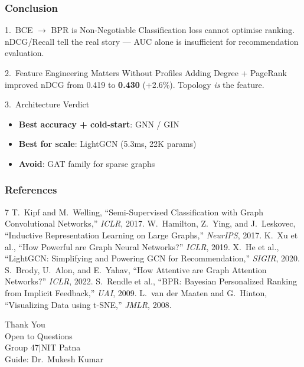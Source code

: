 \documentclass[10pt,aspectratio=43]{beamer}
\begin{document}
\begin{frame}
\frametitle{Conclusion}
\begin{alertblock}{1.\ BCE $\to$ BPR is Non-Negotiable}
Classification loss cannot optimise ranking.
nDCG/Recall tell the real story --- AUC alone is insufficient for recommendation evaluation.
\end{alertblock}
\begin{alertblock}{2.\ Feature Engineering Matters Without Profiles}
Adding Degree + PageRank improved nDCG from 0.419 to \textbf{0.430} (+2.6\%). Topology \emph{is} the feature.
\end{alertblock}
\begin{alertblock}{3.\ Architecture Verdict}
\begin{itemize}
  \item \textbf{Best accuracy + cold-start}: GNN / GIN
  \item \textbf{Best for scale}: LightGCN (5.3ms, 22K params)
  \item \textbf{Avoid}: GAT family for sparse graphs
\end{itemize}
\end{alertblock}
\end{frame}

\begin{frame}[allowframebreaks]
\frametitle{References}
\begin{thebibliography}{7}
T.~Kipf and M.~Welling, ``Semi-Supervised Classification with Graph Convolutional Networks,'' \emph{ICLR}, 2017.
W.~Hamilton, Z.~Ying, and J.~Leskovec, ``Inductive Representation Learning on Large Graphs,'' \emph{NeurIPS}, 2017.
K.~Xu et al., ``How Powerful are Graph Neural Networks?'' \emph{ICLR}, 2019.
X.~He et al., ``LightGCN: Simplifying and Powering GCN for Recommendation,'' \emph{SIGIR}, 2020.
S.~Brody, U.~Alon, and E.~Yahav, ``How Attentive are Graph Attention Networks?'' \emph{ICLR}, 2022.
S.~Rendle et al., ``BPR: Bayesian Personalized Ranking from Implicit Feedback,'' \emph{UAI}, 2009.
L.~van der Maaten and 
G.~Hinton, ``Visualizing Data using t-SNE,'' \emph{JMLR}, 2008.
\end{thebibliography}
\end{frame}

\begin{frame}[standout]
\Huge Thank You\\[12pt]
\Large Open to Questions\\[16pt]
\normalsize Group 47\enspace$\vert$\enspace NIT Patna\\[4pt]
Guide: Dr.\ Mukesh Kumar
\end{frame}
\end{document}
